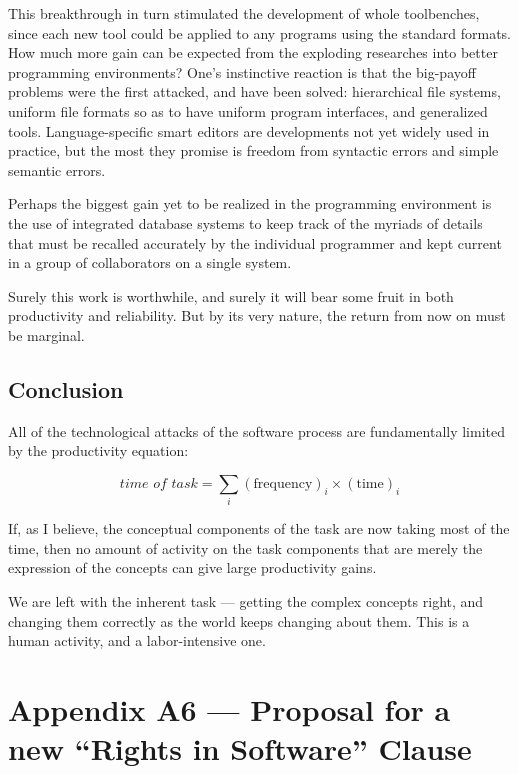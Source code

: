\documentclass[11pt,final]{article}
\begin{document}
This breakthrough in turn stimulated the development of whole toolbenches,
since each new tool could be applied to any programs using the standard
formats. How much more gain can be expected from the exploding researches into
better programming environments?  One’s instinctive reaction is that the
big-payoff problems were the first attacked, and have been solved: hierarchical
file systems, uniform file formats so as to have uniform program interfaces,
and generalized tools. Language-specific smart editors are developments not yet
widely used in practice, but the most they promise is freedom from syntactic
errors and simple semantic errors.

Perhaps the biggest gain yet to be realized in the programming environment is
the use of integrated database systems to keep track of the myriads of details
that must be recalled accurately by the individual programmer and kept current
in a group of collaborators on a single system.

Surely this work is worthwhile, and surely it will bear some fruit in both
productivity and reliability. But by its very nature, the return from now on
must be marginal.

\subsection*{Conclusion}

All of the technological attacks of the software process are fundamentally
limited by the productivity equation:

\[\textit{time of task} = \sum_i (\textrm{frequency})_i \times (\textrm{time})_i\]

If, as I believe, the conceptual components of the task are now taking most of
the time, then no amount of activity on the task components that are merely the
expression of the concepts can give large productivity gains.

We are left with the inherent task — getting the complex concepts right, and
changing them correctly as the world keeps changing about them. This is a human
activity, and a labor-intensive one.

\newpage

\section*{Appendix A6 — Proposal for a new “Rights in Software” Clause}
\end{document}
